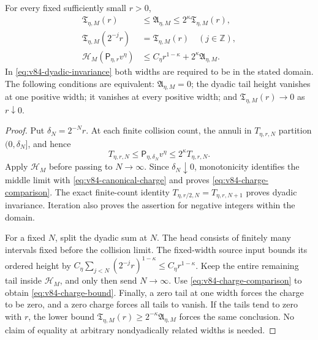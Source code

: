\begin{theorem}
\label{thm:v84-charge}
For every fixed sufficiently small $r>0$,
\begin{align}
 \mathfrak T_{\eta,M}(r)
       &\le\mathfrak A_{\eta,M}
                           \le2^\kappa\mathfrak T_{\eta,M}(r),
                                            \label{eq:v84-charge-comparison}\\
 \mathfrak T_{\eta,M}(2^{-j}r)
       &=\mathfrak T_{\eta,M}(r)\quad(j\in\mathbb Z),
                                            \label{eq:v84-dyadic-invariance}\\
 \mathcal H_M(\mathsf P_{\eta,r}v^\eta)
       &\le C_\eta r^{1-\kappa}
                                +2^\kappa\mathfrak A_{\eta,M}.
                                            \label{eq:v84-charge-bound}
\end{align}
In \eqref{eq:v84-dyadic-invariance} both widths are required to be
in the stated domain. The following conditions are equivalent:
$\mathfrak A_{\eta,M}=0$; the dyadic tail height vanishes at one
positive width; it vanishes at every positive width; and
$\mathfrak T_{\eta,M}(r)\to0$ as $r\downarrow0$.
\end{theorem}
\begin{proof}
Put $\delta_N=2^{-N}r$. At each finite collision count, the annuli
in $T_{\eta,r,N}$ partition $(0,\delta_N]$, and hence
\[
 T_{\eta,r,N}\le\mathsf P_{\eta,\delta_N}v^\eta
                                      \le2^\kappa T_{\eta,r,N}.
\]
Apply $\mathcal H_M$ before passing to $N\to\infty$. Since
$\delta_N\downarrow0$, monotonicity identifies the middle limit
with \eqref{eq:v84-canonical-charge} and proves
\eqref{eq:v84-charge-comparison}. The exact finite-count identity
$T_{\eta,r/2,N}=T_{\eta,r,N+1}$ proves dyadic invariance. Iteration
also proves the assertion for negative integers within the domain.

For a fixed $N$, split the dyadic sum at $N$. The head consists of
finitely many intervals fixed before the collision limit. The
fixed-width source input bounds its ordered height by
$C_\eta\sum_{j<N}(2^{-j}r)^{1-\kappa}\le C_\eta r^{1-\kappa}$.
Keep the entire remaining tail inside $\mathcal H_M$, and only then
send $N\to\infty$. Use \eqref{eq:v84-charge-comparison} to obtain
\eqref{eq:v84-charge-bound}. Finally, a zero tail at one width forces
the charge to be zero, and a zero charge forces all tails to vanish.
If the tails tend to zero with $r$, the lower bound
$\mathfrak T_{\eta,M}(r)\ge2^{-\kappa}\mathfrak A_{\eta,M}$
forces the same conclusion. No claim of equality at arbitrary
nondyadically related widths is needed.
\end{proof}

